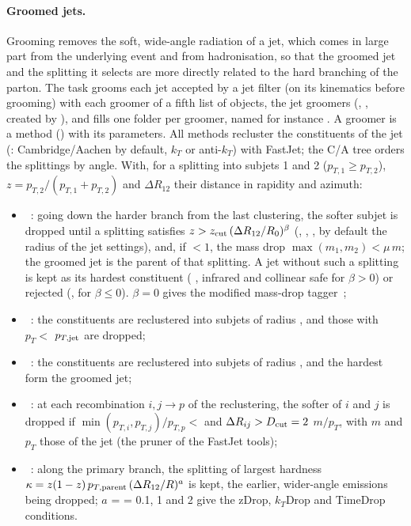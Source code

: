 \paragraph{Groomed jets.}
Grooming removes the soft, wide-angle radiation of a jet, which comes in large part from the underlying event and
from hadronisation, so that the groomed jet and the splitting it selects are more directly related to the hard
branching of the parton. The task  grooms each jet accepted by a jet filter (on its
kinematics before grooming) with each groomer of a fifth list of objects, the jet groomers (,
, created by ), and fills one folder per groomer, named for instance
. A groomer is a method () with its parameters. All methods
recluster the constituents of the jet (: Cambridge/Aachen by default, $k_T$ or anti-$k_T$) with
FastJet; the C/A tree orders the splittings by angle. With, for a splitting into subjets 1 and 2
($p_{T,1}\ge p_{T,2}$), $z = p_{T,2}/(p_{T,1}+p_{T,2})$ and $\Delta R_{12}$ their distance in rapidity and azimuth:
\begin{itemize}
  \item {}~\cite{Larkoski:2014wba}: going down the harder branch from the last clustering, the softer
  subjet is dropped until a splitting satisfies $z > z_{\rm cut}\,(\Delta R_{12}/R_0)^\beta$ (,
  , , by default the radius of the jet settings), and, if  $<1$, the mass drop
  $\max(m_1,m_2) < \mu\, m$; the groomed jet is the parent of that splitting. A jet without such a splitting is
  kept as its hardest constituent ( , infrared and collinear safe for $\beta>0$) or rejected
  (, for $\beta \le 0$). $\beta = 0$ gives the modified mass-drop tagger~\cite{Dasgupta:2013ihk};
  \item {}~\cite{Krohn:2009th}: the constituents are reclustered into subjets of radius , and
  those with $p_T <$  $p_{T,{\rm jet}}$ are dropped;
  \item {}~\cite{Butterworth:2008iy}: the constituents are reclustered into subjets of radius
  , and the  hardest form the groomed jet;
  \item {}~\cite{Ellis:2009su,Ellis:2009me}: at each recombination $i,j\to p$ of the reclustering, the softer
  of $i$ and $j$ is dropped if $\min(p_{T,i},p_{T,j})/p_{T,p} <$  and
  $\Delta R_{ij} > D_{\rm cut} = 2\,$$\,m/p_T$, with $m$ and $p_T$ those of the jet (the pruner of
  the FastJet tools);
  \item {}~\cite{Mehtar-Tani:2019rrk}: along the primary branch, the splitting of largest hardness
  $\kappa = z(1-z)\,p_{T,{\rm parent}}\,(\Delta R_{12}/R)^a$ is kept, the earlier, wider-angle emissions being dropped;
  $a$ =  = 0.1, 1 and 2 give the zDrop, $k_T$Drop and TimeDrop conditions.
\end{itemize}
